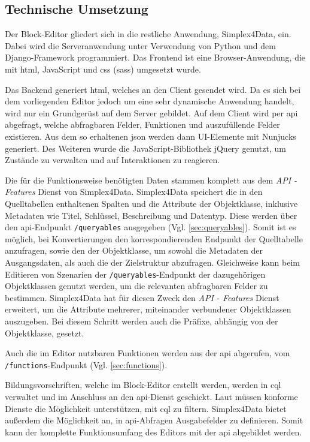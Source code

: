\subsection{Technische Umsetzung}
Der Block-Editor gliedert sich in die restliche Anwendung, Simplex4Data, ein. Dabei wird die Serveranwendung unter Verwendung von Python und dem Django-Framework \parencite{djangosoftwarefoundationDjango} programmiert. Das Frontend ist eine Browser-Anwendung, die mit \ac{html}, JavaScript und \ac{css} (\ac{sass}) umgesetzt wurde.

Das Backend generiert \ac{html}, welches an den Client gesendet wird. Da es sich bei dem vorliegenden Editor jedoch um eine sehr dynamische Anwendung handelt, wird nur ein Grundgerüst auf dem Server gebildet. Auf dem Client wird per \ac{api} abgefragt, welche abfragbaren Felder, Funktionen und auszufüllende Felder existieren. Aus dem so erhaltenen \ac{json} werden dann UI-Elemente mit Nunjucks \parencite{mozillaNunjucks} generiert. Des Weiteren wurde die JavaScript-Bibliothek jQuery \parencite{openjsfoundationJQuery} genutzt, um Zustände zu verwalten und auf Interaktionen zu reagieren.

Die für die Funktionsweise benötigten Daten stammen komplett aus dem \textit{API - Features} Dienst \parencite{ogcAPI} von Simplex4Data. Simplex4Data speichert die in den Quelltabellen enthaltenen Spalten und die Attribute der Objektklasse, inklusive Metadaten wie Titel, Schlüssel, Beschreibung und Datentyp. Diese werden über den \ac{api}-Endpunkt \texttt{/queryables} ausgegeben (Vgl. \ref{sec:queryables}). Somit ist es möglich, bei Konvertierungen den korrespondierenden Endpunkt der Quelltabelle anzufragen, sowie den der Objektklasse, um sowohl die Metadaten der Ausgangsdaten, als auch die der Zielstruktur abzufragen. Gleichweise kann beim Editieren von Szenarien der \texttt{/queryables}-Endpunkt der dazugehörigen Objektklassen genutzt werden, um die relevanten abfragbaren Felder zu bestimmen. Simplex4Data hat für diesen Zweck den \textit{API - Features} Dienst erweitert, um die Attribute mehrerer, miteinander verbundener Objektklassen auszugeben. Bei diesem Schritt werden auch die Präfixe, abhängig von der Objektklasse, gesetzt.

Auch die im Editor nutzbaren Funktionen werden aus der \ac{api} abgerufen, vom \texttt{/functions}-Endpunkt (Vgl. \ref{sec:functions}).

Bildungsvorschriften, welche im Block-Editor erstellt werden, werden in \ac{cql} verwaltet und im Anschluss an den \ac{api}-Dienst geschickt. Laut  müssen konforme Dienste die Möglichkeit unterstützen, mit \ac{cql} zu filtern. Simplex4Data bietet außerdem die Möglichkeit an, in \ac{api}-Abfragen Ausgabefelder zu definieren. Somit kann der komplette Funktionsumfang des Editors mit der \ac{api} abgebildet werden.
